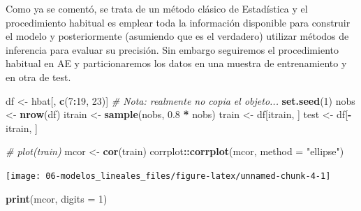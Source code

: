 \documentclass[
]{book}
\newenvironment{Shaded}{\begin{snugshade}}{\end{snugshade}}
\newcommand{\CommentTok}[1]{\textcolor[rgb]{0.56,0.35,0.01}{\textit{#1}}}
\newcommand{\DataTypeTok}[1]{\textcolor[rgb]{0.13,0.29,0.53}{#1}}
\newcommand{\DecValTok}[1]{\textcolor[rgb]{0.00,0.00,0.81}{#1}}
\newcommand{\FloatTok}[1]{\textcolor[rgb]{0.00,0.00,0.81}{#1}}
\newcommand{\KeywordTok}[1]{\textcolor[rgb]{0.13,0.29,0.53}{\textbf{#1}}}
\newcommand{\NormalTok}[1]{#1}
\newcommand{\OperatorTok}[1]{\textcolor[rgb]{0.81,0.36,0.00}{\textbf{#1}}}
\newcommand{\StringTok}[1]{\textcolor[rgb]{0.31,0.60,0.02}{#1}}
\theoremstyle{break}
\theoremstyle{definition}
\theoremstyle{definition}
\theoremstyle{definition}
\theoremstyle{remark}
\begin{document}
Como ya se comentó, se trata de un método clásico de Estadística y el procedimiento habitual es emplear toda la información disponible para construir el modelo y posteriormente (asumiendo que es el verdadero) utilizar métodos de inferencia para evaluar su precisión.
Sin embargo seguiremos el procedimiento habitual en AE y particionaremos los datos en una muestra de entrenamiento y en otra de test.

\begin{Shaded}
\begin{Highlighting}[]
\NormalTok{df <-}\StringTok{ }\NormalTok{hbat[, }\KeywordTok{c}\NormalTok{(}\DecValTok{7}\OperatorTok{:}\DecValTok{19}\NormalTok{, }\DecValTok{23}\NormalTok{)]  }\CommentTok{# Nota: realmente no copia el objeto...}
\KeywordTok{set.seed}\NormalTok{(}\DecValTok{1}\NormalTok{)}
\NormalTok{nobs <-}\StringTok{ }\KeywordTok{nrow}\NormalTok{(df)}
\NormalTok{itrain <-}\StringTok{ }\KeywordTok{sample}\NormalTok{(nobs, }\FloatTok{0.8} \OperatorTok{*}\StringTok{ }\NormalTok{nobs)}
\NormalTok{train <-}\StringTok{ }\NormalTok{df[itrain, ]}
\NormalTok{test <-}\StringTok{ }\NormalTok{df[}\OperatorTok{-}\NormalTok{itrain, ]}

\CommentTok{# plot(train)}
\NormalTok{mcor <-}\StringTok{ }\KeywordTok{cor}\NormalTok{(train)}
\NormalTok{corrplot}\OperatorTok{::}\KeywordTok{corrplot}\NormalTok{(mcor, }\DataTypeTok{method =} \StringTok{"ellipse"}\NormalTok{)}
\end{Highlighting}
\end{Shaded}

\begin{center}\texttt{[image: 06-modelos\_lineales\_files/figure-latex/unnamed-chunk-4-1]} \end{center}

\begin{Shaded}
\begin{Highlighting}[]
\KeywordTok{print}\NormalTok{(mcor, }\DataTypeTok{digits =} \DecValTok{1}\NormalTok{)}
\end{Highlighting}
\end{Shaded}
\end{document}
